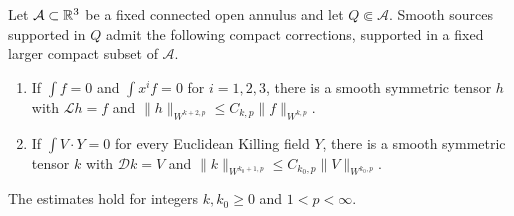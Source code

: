 \begin{lemma}
\label{n3:reduction:compact-inverses}
Let $\mathcal A\subset\mathbb R^3$ be a fixed connected open annulus and let
$Q\Subset\mathcal A$.  Smooth sources supported in $Q$ admit the
following compact corrections, supported in a fixed larger compact
subset of $\mathcal A$.
\begin{enumerate}[label=\textup{(\roman*)}]
\item If $\int f=0$ and $\int x^if=0$ for $i=1,2,3$, there is a smooth
      symmetric tensor $h$ with $\mathcal Lh=f$ and
      $\|h\|_{W^{k+2,p}}\le C_{k,p}\|f\|_{W^{k,p}}$.
\item If $\int V\cdot Y=0$ for every Euclidean Killing field $Y$, there
      is a smooth symmetric tensor $k$ with $\mathcal Dk=V$ and
      $\|k\|_{W^{k_0+1,p}}\le C_{k_0,p}\|V\|_{W^{k_0,p}}$.
\end{enumerate}
The estimates hold for integers $k,k_0\ge0$ and $1<p<\infty$.
\end{lemma}

